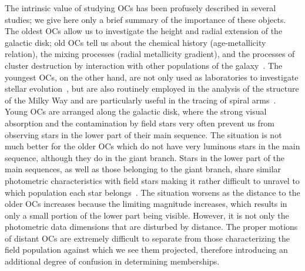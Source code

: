 \documentclass{aa}
\begin{document}
 The intrinsic value of studying OCs has been profusely described in several
 studies; we  give here only a brief summary of the importance
 of these objects. The oldest OCs
 allow us to investigate the height and radial extension of the galactic disk;
 old OCs tell us about the chemical history (age-metallicity relation), the
 mixing processes (radial metallicity gradient), and the processes of cluster
 destruction by interaction with other populations of the
 galaxy~\citep{Friel1995,Tosi_2004,Lamers_2005}.
 The youngest OCs, on the other hand, are not only used as laboratories to
 investigate stellar evolution~\citep[they allow  the boundary
 conditions necessary to create new generations of stars to be studied in detail;][]{Lada2003}, but are
 also routinely employed in the analysis of the structure of the  Milky Way \citep{Loktin_1992,Moitinho_2006,Vazquez2008,Moitinho_2010}
 and are  particularly useful in the tracing of spiral
 arms~\citep{carraro_2013,Molina_2018}.
 Young OCs are arranged along the galactic disk, where the strong visual
 absorption and the contamination by field stars very often prevent us from observing
 stars in the lower part of their main sequence.
 The situation is not much better for the older OCs which do not
 have very luminous stars in the main sequence, although they do in the giant
 branch. Stars in the lower part of the main sequences, as well as those
 belonging to the giant branch, share similar photometric characteristics with
 field stars making it rather difficult to unravel to which population each star
 belongs~\citep{Hayes_2015}.
 The situation worsens as the distance to the older OCs increases because the
 limiting magnitude increases, which results in only a small portion of
 the lower part being visible. However,  it is not only the photometric
 data dimensions that are disturbed by distance. The proper
 motions of distant OCs are
 extremely difficult to separate from those characterizing the field
 population against which we see them projected, therefore introducing an
 additional degree of confusion in determining memberships.
\end{document}
